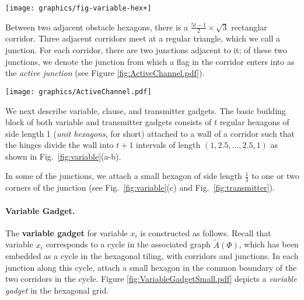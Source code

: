 \documentclass[10pt]{CSUNthesis}
\theoremstyle{plain}%
\theoremstyle{definition}
\theoremstyle{remark}
\begin{document}
\begin{minipage}{\linewidth}
\begin{center}
\texttt{[image: graphics/fig-variable-hex+]}
\label{fig:variable}
\end{center}
\end{minipage}

Between two adjacent obstacle hexagons, there is a $\frac{5t-1}{2}\times \sqrt{3}$ rectanglar corridor.  %
Three adjacent corridors meet at a regular triangle, which we call a junction. 
For each corridor, there are two junctions adjacent to it; of these two junctions, we denote the junction from which a flag in the corridor enters into as the \textit{active junction} (see Figure \ref{fig:ActiveChannel.pdf}).

\begin{minipage}{\linewidth}
\begin{center}
\texttt{[image: graphics/ActiveChannel.pdf]}
\label{fig:ActiveChannel.pdf}
\end{center}
\end{minipage}

We next describe variable, clause, and transmitter gadgets.
The basic building block of both variable and transmitter gadgets consists of $t$ regular hexagons of side length 1 (\emph{unit hexagons}, for short) attached to a wall of a corridor such that the hinges divide the wall into $t+1$ intervals of length $(1,2.5,\ldots ,2.5,1)$ as shown in Fig.~\ref{fig:variable}(a-b). 

In some of the junctions, we attach a small hexagon of side length $\frac{1}{3}$ to one or two corners of the junction (see Fig.~\ref{fig:variable}(c) and Fig.~\ref{fig:transmitter}). 

\paragraph{Variable Gadget.}
The {\bf variable gadget} for variable $x_i$ is constructed as follows. 
Recall that variable $x_i$ corresponds to a cycle in the associated graph $\tilde{A}(\Phi)$, which has been embedded as a cycle in the hexagonal tiling, with corridors and junctions. 
In each junction along this cycle, attach a small hexagon in the common boundary of the two corridors in the cycle. 
Figure \ref{fig:VariableGadgetSmall.pdf} depicts a \textit{variable gadget} in the hexagonal grid.
\end{document}
